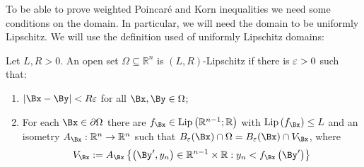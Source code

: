  
    To be able to prove weighted Poincaré and Korn inequalities we need some conditions on the domain. In particular, we will need the domain to be uniformly Lipschitz.  We will use the definition used \cite{conti0} of uniformly Lipschitz domains:

\begin{definition} \label{UniformLip} Let $L, R>0$. An open set $\Omega \subseteq \mathbb{R}^n$ is $(L, R)$-Lipschitz if there is $\varepsilon>0$ such that:
\begin{enumerate}
    \item $|\Bx-\By|<R\varepsilon$ for all $\Bx, \By \in \Omega$;
    \item For each $\Bx \in \partial \Omega$ there are $f_\Bx \in \operatorname{Lip}\left(\mathbb{R}^{n-1} ; \mathbb{R}\right)$ with $\operatorname{Lip}\left(f_\Bx\right) \leq L$ and an isometry $A_\Bx: \mathbb{R}^n \rightarrow \mathbb{R}^n$ such that $B_\varepsilon(\Bx) \cap \Omega=B_\varepsilon(\Bx) \cap V_\Bx$, where
        $$
            V_\Bx:=A_\Bx\left\{\left(\By^{\prime}, y_n\right) \in \mathbb{R}^{n-1} \times \mathbb{R}: y_n<f_\Bx\left(\By^{\prime}\right)\right\}
        $$
\end{enumerate}
\end{definition}



